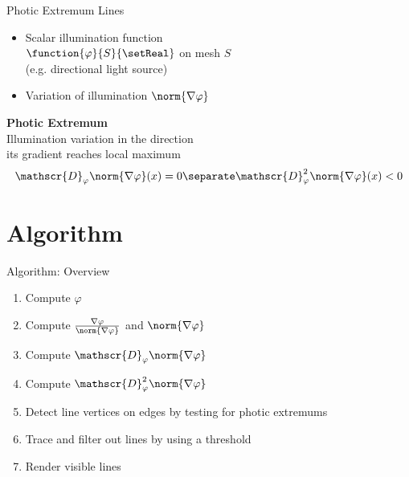 \documentclass[aspectratio=169]{beamer}
\begin{document}
\begin{frame}{Photic Extremum Lines}
\begin{minipage}[c]{0.4\textwidth}
    \end{minipage}
    \hfill
    \begin{minipage}[c]{0.55\textwidth}
      \begin{itemize}
        \item<1-> Scalar illumination function \\
        $\function{\varphi}{S}{\setReal}$ on mesh $S$ \\
        (e.g. directional light source)
        \item<2-> Variation of illumination $\norm{\nabla\varphi}$
      \end{itemize}
      \bigskip
      \begin{mybox}
        \textbf{Photic Extremum}\\
        Illumination variation in the direction \\
        its gradient reaches local maximum
        \[
          \mathscr{D}_\varphi \norm{\nabla \varphi}(x) = 0
          \separate
          \mathscr{D}_\varphi^2 \norm{\nabla \varphi}(x) < 0
        \]
      \end{mybox}
    \end{minipage}
  \end{frame}

\section{Algorithm}
  \begin{frame}{Algorithm: Overview}
    \begin{mybox}
      \pause
      \begin{enumerate}
        \item<+-> Compute $\varphi$
        \item<+-> Compute $\frac{\nabla\varphi}{\norm{\nabla\varphi}}$ and $\norm{\nabla\varphi}$
        \item<+-> Compute $\mathscr{D}_\varphi \norm{\nabla\varphi}$
        \item<+-> Compute $\mathscr{D}^2_\varphi \norm{\nabla\varphi}$
        \item<+-> Detect line vertices on edges by testing for photic extremums
        \item<+-> Trace and filter out lines by using a threshold
        \item<+-> Render visible lines
      \end{enumerate}
    \end{mybox}
  \end{frame}
\end{document}

